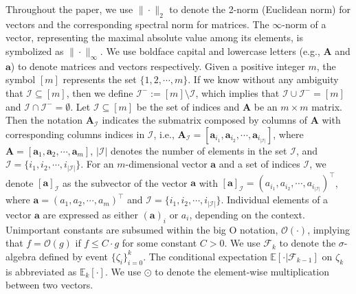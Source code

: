 \documentclass[aos]{imsart}
\numberwithin{equation}{section}
\theoremstyle{plain}
\begin{document}
Throughout the paper, we use $\|\cdot\|_2$ to denote the 2-norm (Euclidean norm) for vectors and the corresponding spectral norm for matrices. The $\infty$-norm of a vector, representing the maximal absolute value among its elements, is symbolized as $\|\cdot\|_{\infty}$. We use boldface capital and lowercase letters (e.g., $\bm{A}$ and $\bm{a}$) to denote matrices and vectors respectively. Given a positive integer $m$, the symbol $[m]$ represents the set $\{1, 2, \cdots, m\}$. If we know without any ambiguity that $\mathcal{I} \subseteq [m]$, then we define $\mathcal{I}^{-} := [m] \setminus \mathcal{I}$, which implies that $\mathcal{I} \cup \mathcal{I}^{-} = [m]$ and $\mathcal{I} \cap \mathcal{I}^{-} = \emptyset$. Let $\mathcal{I} \subseteq [m]$ be the set of indices and $\bm{A}$ be an $m \times m$ matrix. Then the notation $\bm{A}_{\mathcal{I}}$ indicates the submatrix composed by columns of $\bm{A}$ with corresponding columns indices in $\mathcal{I}$, i.e., $\bm{A}_{\mathcal{I}} = [\bm{a}_{i_1}, \bm{a}_{i_2}, \cdots, \bm{a}_{i_{|\mathcal{I}|}}]$, where $\bm{A} = [\bm{a}_1, \bm{a}_2, \cdots, \bm{a}_{m}]$, $|\mathcal{I}|$ denotes the number of elements in the set $\mathcal{I}$, and $\mathcal{I} = \{i_1, i_2, \cdots, i_{|\mathcal{I}|}\}$. For an $m$-dimensional vector $\bm{a}$ and a set of indices $\mathcal{I}$, we denote $[\bm{a}]_{\mathcal{I}}$ as the subvector of the vector $\bm{a}$ with $[\bm{a}]_{\mathcal{I}} = (a_{i_1}, a_{i_2}, \cdots, a_{i_{|\mathcal{I}|}})^{\top}$, where $\bm{a} = (a_{1}, a_{2}, \cdots, a_{m})^{\top}$ and $\mathcal{I} = \{i_1, i_2, \cdots, i_{|\mathcal{I}|}\}$. Individual elements of a vector $\bm{a}$ are expressed as either $(\bm{a})_i$ or $a_i$, depending on the context. 
Unimportant constants are subsumed within the big O notation, $\mathcal{O}(\cdot)$, implying that $f = \mathcal{O}(g)$ if $f \leq C \cdot g$ for some constant $C > 0$. We use $\mathcal{F}_k$ to denote the $\sigma$-algebra defined by event $\{\zeta_{i}\}_{i=0}^{k}$. The conditional expectation $\mathbb{E}\left[\cdot | \mathcal{F}_{k-1}\right]$ on $\zeta_k$ is abbreviated as $\mathbb{E}_k\left[\cdot\right]$. We use $\odot$ to denote the element-wise multiplication between two vectors. 
\end{document}
